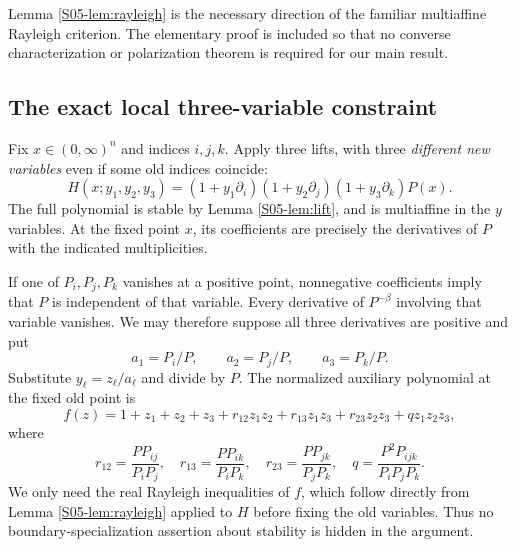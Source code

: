 \documentclass[11pt,a4paper]{article}
\theoremstyle{definition}\newtheorem{definition}[theorem]{Definition}
\theoremstyle{remark}\newtheorem{remark}[theorem]{Remark}
\numberwithin{equation}{section}
\begin{document}
Lemma \ref{S05-lem:rayleigh} is the necessary direction of the familiar multiaffine Rayleigh criterion. The elementary proof is included so that no converse characterization or polarization theorem is required for our main result.

\subsection{The exact local three-variable constraint}\label{S05-sec-3}
Fix $x\in(0,\infty)^n$ and indices $i,j,k$. Apply three lifts, with three \emph{different new variables} even if some old indices coincide:
\[
 H(x;y_1,y_2,y_3)
 =(1+y_1\partial_i)(1+y_2\partial_j)(1+y_3\partial_k)P(x).
\]
The full polynomial is stable by Lemma \ref{S05-lem:lift}, and is multiaffine in the $y$ variables. At the fixed point $x$, its coefficients are precisely the derivatives of $P$ with the indicated multiplicities.

If one of $P_i,P_j,P_k$ vanishes at a positive point, nonnegative coefficients imply that $P$ is independent of that variable. Every derivative of $P^{-\beta}$ involving that variable vanishes. We may therefore suppose all three derivatives are positive and put
\[
 a_1=P_i/P,\qquad a_2=P_j/P,\qquad a_3=P_k/P.
\]
Substitute $y_\ell=z_\ell/a_\ell$ and divide by $P$. The normalized auxiliary polynomial at the fixed old point is
\begin{equation}\label{S05-eq:normal}
 f(z)=1+z_1+z_2+z_3+r_{12}z_1z_2+r_{13}z_1z_3+r_{23}z_2z_3+qz_1z_2z_3,
\end{equation}
where
\[
 r_{12}=\frac{PP_{ij}}{P_iP_j},\quad
 r_{13}=\frac{PP_{ik}}{P_iP_k},\quad
 r_{23}=\frac{PP_{jk}}{P_jP_k},\quad
 q=\frac{P^2P_{ijk}}{P_iP_jP_k}.
\]
We only need the real Rayleigh inequalities of $f$, which follow directly from Lemma \ref{S05-lem:rayleigh} applied to $H$ before fixing the old variables. Thus no boundary-specialization assertion about stability is hidden in the argument.
\end{document}

